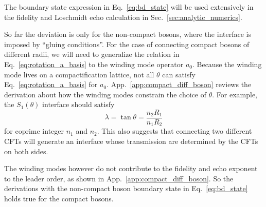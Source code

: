 The boundary state expression in Eq.~\eqref{eq:bd_state} will be used extensively in the fidelity and Loschmidt echo calculation in Sec.~\ref{sec:analytic_numerics}. 

So far the deviation is only for the non-compact bosons, where the interface is imposed by ``gluing conditions''. For the case of connecting compact bosons of different radii, we will need to generalize the relation in Eq.~\eqref{eq:rotation_a_basis} to the winding mode operator $a_0$. Because the winding mode lives on a compactification lattice, not all $\theta$ can satisfy Eq.~\eqref{eq:rotation_a_basis} for $a_0$. App.~\ref{app:compact_diff_boson} reviews the derivation about how the winding modes constrain the choice of $\theta$. For example, the $S_1(\theta)$ interface should satisfy
\begin{equation}
\lambda = \tan \theta = \frac{n_2 R_1}{n_1 R_2}
\end{equation}
for coprime integer $n_1$ and $n_2$. This also suggests that connecting two different CFTs will generate an interface whose transmission are determined by the CFTs on both sides. 

The winding modes however do not contribute to the fidelity and echo exponent to the leader order, as shown in App.~\ref{app:compact_diff_boson}. So the derivations with the non-compact boson boundary state in Eq.~\eqref{eq:bd_state} holds true for the compact bosons.

